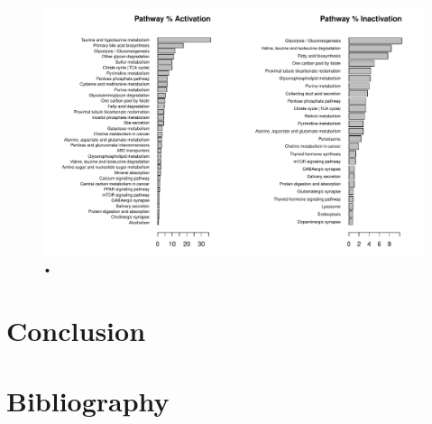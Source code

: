\begin{figure}[h]
\begin{center}
\includegraphics[width=\textwidth]{neuroprotective/Inflammated2Tibolone}
\end{center}
\caption{•}
\end{figure}
\section{Conclusion}
\section{Bibliography}

